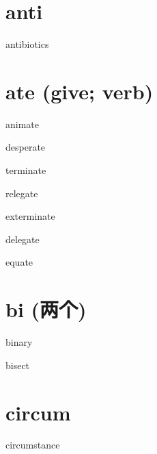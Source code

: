 \section{anti}

\begin{RefWord}{antibiotics}
\end{RefWord}

\section{ate (give; verb)}

\begin{RefWord}{animate}
\end{RefWord}

\begin{RefWord}{desperate}
\end{RefWord}

\begin{RefWord}{terminate}
\end{RefWord}

\begin{RefWord}{relegate}
\end{RefWord}

\begin{RefWord}{exterminate}
\end{RefWord}

\begin{RefWord}{delegate}
\end{RefWord}

\begin{RefWord}{equate}
\end{RefWord}

\section{bi (两个)}

\begin{RefWord}{binary}
\end{RefWord}

\begin{RefWord}{bisect}
\end{RefWord}



\section{circum}

\begin{RefWord}{circumstance}
\end{RefWord}

